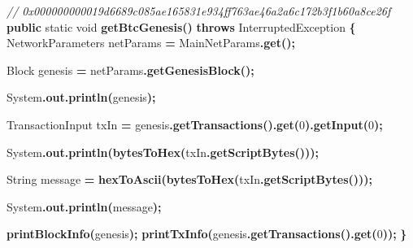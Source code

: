 \documentclass[
  italian,
  openany]{book}
\newenvironment{Shaded}{\begin{snugshade}}{\end{snugshade}}
\newcommand{\BuiltInTok}[1]{#1}
\newcommand{\CommentTok}[1]{\textcolor[rgb]{0.56,0.35,0.01}{\textit{#1}}}
\newcommand{\DataTypeTok}[1]{\textcolor[rgb]{0.13,0.29,0.53}{#1}}
\newcommand{\DecValTok}[1]{\textcolor[rgb]{0.00,0.00,0.81}{#1}}
\newcommand{\FunctionTok}[1]{\textcolor[rgb]{0.13,0.29,0.53}{\textbf{#1}}}
\newcommand{\KeywordTok}[1]{\textcolor[rgb]{0.13,0.29,0.53}{\textbf{#1}}}
\newcommand{\NormalTok}[1]{#1}
\newcommand{\OperatorTok}[1]{\textcolor[rgb]{0.81,0.36,0.00}{\textbf{#1}}}
\begin{document}
\begin{Shaded}
\begin{Highlighting}[]
\CommentTok{// 0x000000000019d6689c085ae165831e934ff763ae46a2a6c172b3f1b60a8ce26f}
\KeywordTok{public} \DataTypeTok{static} \DataTypeTok{void} \FunctionTok{getBtcGenesis}\OperatorTok{()} \KeywordTok{throws} \BuiltInTok{InterruptedException} \OperatorTok{\{}
\NormalTok{    NetworkParameters netParams }\OperatorTok{=}\NormalTok{ MainNetParams}\OperatorTok{.}\FunctionTok{get}\OperatorTok{();}

\NormalTok{    Block genesis }\OperatorTok{=}\NormalTok{ netParams}\OperatorTok{.}\FunctionTok{getGenesisBlock}\OperatorTok{();}

    \BuiltInTok{System}\OperatorTok{.}\FunctionTok{out}\OperatorTok{.}\FunctionTok{println}\OperatorTok{(}\NormalTok{genesis}\OperatorTok{);}

\NormalTok{    TransactionInput txIn }\OperatorTok{=}\NormalTok{ genesis}\OperatorTok{.}\FunctionTok{getTransactions}\OperatorTok{().}\FunctionTok{get}\OperatorTok{(}\DecValTok{0}\OperatorTok{).}\FunctionTok{getInput}\OperatorTok{(}\DecValTok{0}\OperatorTok{);}

    \BuiltInTok{System}\OperatorTok{.}\FunctionTok{out}\OperatorTok{.}\FunctionTok{println}\OperatorTok{(}\FunctionTok{bytesToHex}\OperatorTok{(}\NormalTok{txIn}\OperatorTok{.}\FunctionTok{getScriptBytes}\OperatorTok{()));}

    \BuiltInTok{String}\NormalTok{ message }\OperatorTok{=} \FunctionTok{hexToAscii}\OperatorTok{(}\FunctionTok{bytesToHex}\OperatorTok{(}\NormalTok{txIn}\OperatorTok{.}\FunctionTok{getScriptBytes}\OperatorTok{()));}

    \BuiltInTok{System}\OperatorTok{.}\FunctionTok{out}\OperatorTok{.}\FunctionTok{println}\OperatorTok{(}\NormalTok{message}\OperatorTok{);}

    \FunctionTok{printBlockInfo}\OperatorTok{(}\NormalTok{genesis}\OperatorTok{);}
    \FunctionTok{printTxInfo}\OperatorTok{(}\NormalTok{genesis}\OperatorTok{.}\FunctionTok{getTransactions}\OperatorTok{().}\FunctionTok{get}\OperatorTok{(}\DecValTok{0}\OperatorTok{));}
\OperatorTok{\}}


\end{Highlighting}
\end{Shaded}
\end{document}
